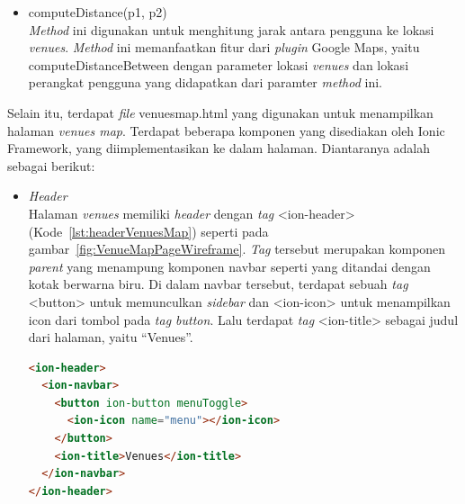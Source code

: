 \begin{itemize}
\begin{itemize}
		\item computeDistance(p1, p2)\\
		\textit{Method} ini digunakan untuk menghitung jarak antara pengguna ke lokasi \textit{venues}. \textit{Method} ini memanfaatkan fitur dari \textit{plugin} Google Maps, yaitu computeDistanceBetween dengan parameter lokasi \textit{venues} dan lokasi perangkat pengguna yang didapatkan dari paramter \textit{method} ini.
	\end{itemize}
	
	Selain itu, terdapat \textit{file} venues\textunderscore map.html yang digunakan untuk menampilkan halaman \textit{venues map}. Terdapat beberapa komponen yang disediakan oleh Ionic Framework, yang diimplementasikan ke dalam halaman. Diantaranya adalah sebagai berikut:

	\begin{itemize}
		\item \textit{Header} \\
		 Halaman \textit{venues} memiliki \textit{header} dengan \textit{tag} <ion-header> (Kode~\ref{lst:headerVenuesMap}) seperti pada gambar~\ref{fig:VenueMapPageWireframe}. \textit{Tag} tersebut merupakan komponen \textit{parent} yang menampung komponen navbar seperti yang ditandai dengan kotak berwarna biru. Di dalam navbar tersebut, terdapat sebuah \textit{tag} <button> untuk memunculkan \textit{sidebar} dan <ion-icon> untuk menampilkan icon dari tombol pada \textit{tag button}. Lalu terdapat \textit{tag} <ion-title> sebagai judul dari halaman, yaitu ``Venues''.
		
\begin{lstlisting}[language=html, label={lst:headerVenuesMap}, caption=\textit{Header} pada venues\textunderscore map.html]
<ion-header>
  <ion-navbar>
    <button ion-button menuToggle>
      <ion-icon name="menu"></ion-icon>
    </button>
    <ion-title>Venues</ion-title>
  </ion-navbar>
</ion-header>
\end{lstlisting}


\end{itemize}
\end{itemize}
